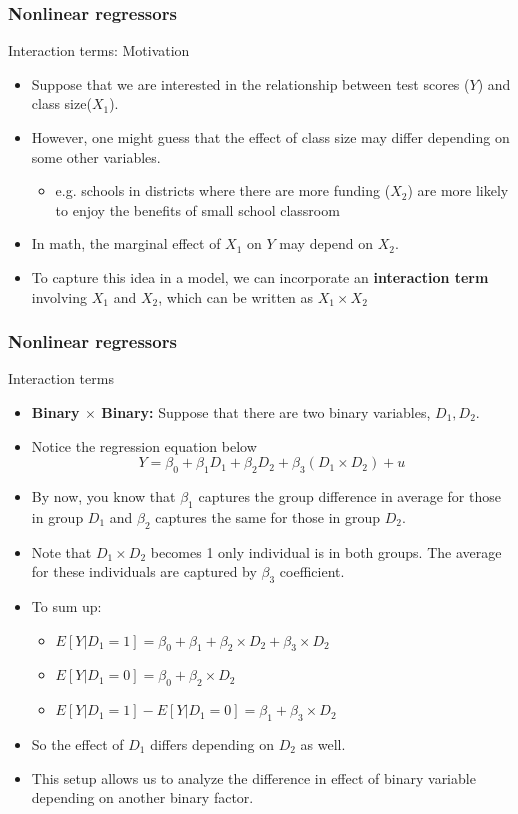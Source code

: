 \documentclass[compress]{beamer}
\begin{document}
\begin{frame}
\frametitle{Nonlinear regressors}
Interaction terms: Motivation
\begin{itemize}
\item Suppose that we are interested in the relationship between test scores ($Y$) and class size($X_1$). 
\item However, one might guess that the effect of class size may differ depending on some other variables. 
\begin{itemize}
\item e.g. schools in districts where there are more funding ($X_2$) are more likely to enjoy the benefits of small school classroom
\end{itemize}
\item In math, the marginal effect of $X_1$ on $Y$ may depend on $X_2$. 
\item To capture this idea in a model, we can incorporate an \textbf{interaction term} involving $X_1$ and $X_2$, which can be written as $X_1 \times X_2$ \par\medskip
\end{itemize}
\end{frame}

\begin{frame}
\frametitle{Nonlinear regressors}
Interaction terms
\begin{itemize}
\item \textbf{Binary $\times$ Binary: } Suppose that there are two binary variables, $D_1, D_2$.
\item Notice the regression equation below
\[
Y= \beta_0 + \beta_1 D_1 + \beta_2 D_2 + \beta_3 (D_1 \times D_2) + u
\]  
\item By now, you know that $\beta_1$ captures the group difference in average for those in group $D_1$ and $\beta_2$ captures the same for those in group $D_2$. 
\item Note that $D_1 \times D_2$ becomes 1 only individual is in both groups. The average for these individuals are captured by $\beta_3$ coefficient. 
\item To sum up:
\begin{itemize}
\item $E[Y|D_1 = 1] = \beta_0+\beta_1+\beta_2\times D_2+\beta_3\times D_2$
\item $E[Y|D_1 = 0] = \beta_0+\beta_2\times D_2$
\item $E[Y|D_1 = 1]-E[Y|D_1 = 0] = \beta_1 + \beta_3\times D_2$
\end{itemize}
\item So the effect of $D_1$ differs depending on $D_2$ as well. 
\item This setup allows us to analyze the difference in effect of binary variable depending on another binary factor. 
\end{itemize}
\end{frame}
\end{document}
